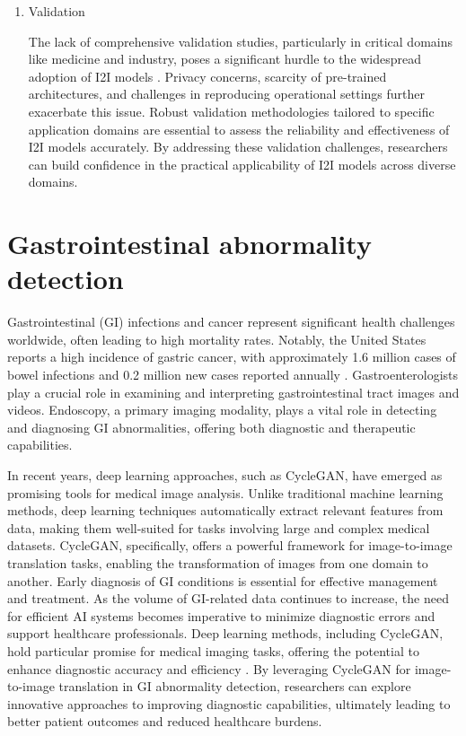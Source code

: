 \documentclass[UKenglish,12pt]{master-style}
\begin{document}
\begin{enumerate}
\item Validation

The lack of comprehensive validation studies, particularly in critical domains like medicine and industry, poses a significant hurdle to the widespread adoption of I2I models \cite{application}. Privacy concerns, scarcity of pre-trained architectures, and challenges in reproducing operational settings further exacerbate this issue. Robust validation methodologies tailored to specific application domains are essential to assess the reliability and effectiveness of I2I models accurately. By addressing these validation challenges, researchers can build confidence in the practical applicability of I2I models across diverse domains.

\end{enumerate}

\section{Gastrointestinal abnormality detection}

Gastrointestinal (GI) infections and cancer represent significant health challenges worldwide, often leading to high mortality rates. Notably, the United States reports a high incidence of gastric cancer, with approximately 1.6 million cases of bowel infections and 0.2 million new cases reported annually \cite{Gastrointestinal}. 
Gastroenterologists play a crucial role in examining and interpreting gastrointestinal tract images and videos. Endoscopy, a primary imaging modality, plays a vital role in detecting and diagnosing GI abnormalities, offering both diagnostic and therapeutic capabilities. 

In recent years, deep learning approaches, such as CycleGAN, have emerged as promising tools for medical image analysis. Unlike traditional machine learning methods, deep learning techniques automatically extract relevant features from data, making them well-suited for tasks involving large and complex medical datasets. CycleGAN, specifically, offers a powerful framework for image-to-image translation tasks, enabling the transformation of images from one domain to another. Early diagnosis of GI conditions is essential for effective management and treatment. As the volume of GI-related data continues to increase, the need for efficient AI systems becomes imperative to minimize diagnostic errors and support healthcare professionals. Deep learning methods, including CycleGAN, hold particular promise for medical imaging tasks, offering the potential to enhance diagnostic accuracy and efficiency \cite{CycleGAN} . By leveraging CycleGAN for image-to-image translation in GI abnormality detection, researchers can explore innovative approaches to improving diagnostic capabilities, ultimately leading to better patient outcomes and reduced healthcare burdens.
\end{document}
